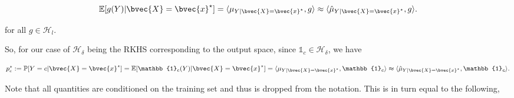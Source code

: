 \documentclass[a4paper, 12pt]{article}
\begin{document}
	\begin{equation}
		\mathbb{E}[g(Y) | \bvec{X} = \bvec{x}^{\star}] = \langle \mu_{Y | \bvec{X} = \bvec{x}^{\star}}, g \rangle \approx \langle \hat{\mu}_{Y | \bvec{X} = \bvec{x}^{\star}}, g \rangle.
	\end{equation}
	
	for all $g \in \mathcal{H}_{l}$.
	
	So, for our case of $\mathcal{H}_{\delta}$ being the RKHS corresponding to the output space, since $\mathbb{1}_{c} \in \mathcal{H}_{\delta}$, we have
	
	\begin{equation}
		p^{\star}_{c} := \mathbb{P}[Y = c | \bvec{X} = \bvec{x}^{\star}] = \mathbb{E}[\mathbb{1}_{c}(Y) | \bvec{X} = \bvec{x}^{\star}] = \langle \mu_{Y | \bvec{X} = \bvec{x}^{\star}}, \mathbb{1}_{c}  \rangle \approx \langle \hat{\mu}_{Y | \bvec{X} = \bvec{x}^{\star}}, \mathbb{1}_{c}  \rangle.
	\end{equation}	

	Note that all quantities are conditioned on the training set and thus is dropped from the notation. This is in turn equal to the following,
	
\end{document}
